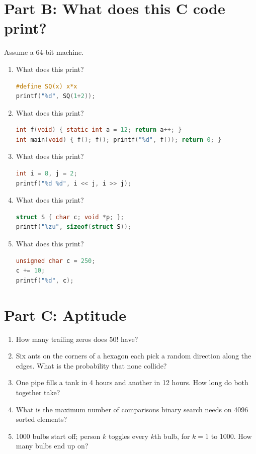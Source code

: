 \section{Part B: What does this C code print?}

Assume a 64-bit machine.

\begin{enumerate}
  \item What does this print?
\begin{lstlisting}[language=C,numbers=none]
#define SQ(x) x*x
printf("%d", SQ(1+2));
\end{lstlisting}
  \item What does this print?
\begin{lstlisting}[language=C,numbers=none]
int f(void) { static int a = 12; return a++; }
int main(void) { f(); f(); printf("%d", f()); return 0; }
\end{lstlisting}
  \item What does this print?
\begin{lstlisting}[language=C,numbers=none]
int i = 8, j = 2;
printf("%d %d", i << j, i >> j);
\end{lstlisting}
  \item What does this print?
\begin{lstlisting}[language=C,numbers=none]
struct S { char c; void *p; };
printf("%zu", sizeof(struct S));
\end{lstlisting}
  \item What does this print?
\begin{lstlisting}[language=C,numbers=none]
unsigned char c = 250;
c += 10;
printf("%d", c);
\end{lstlisting}
\end{enumerate}

\section{Part C: Aptitude}

\begin{enumerate}
  \item How many trailing zeros does $50!$ have?
  \item Six ants on the corners of a hexagon each pick a random direction along the edges. What is the probability that none collide?
  \item One pipe fills a tank in 4 hours and another in 12 hours. How long do both together take?
  \item What is the maximum number of comparisons binary search needs on 4096 sorted elements?
  \item 1000 bulbs start off; person $k$ toggles every $k$th bulb, for $k = 1$ to 1000. How many bulbs end up on?
\end{enumerate}

